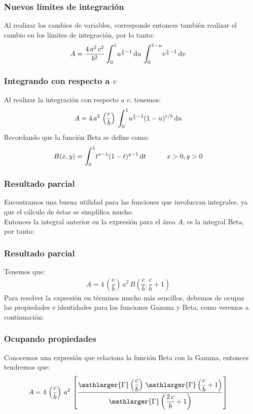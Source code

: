 \documentclass[12pt]{beamer}
\begin{document}
\begin{frame}
\frametitle{Nuevos límites de integración}
Al realizar los cambios de variables, corresponde entonces también realizar el cambio en los límites de integración, por lo tanto:
\pause 
\begin{align*}
A = \dfrac{4 \, a^{2} \, c^{2}}{b^{2}} \, \scaleint{6ex}_{\bs 0}^{1} u^{\frac{c}{b} - 1} \dd{u} \, \scaleint{6ex}_{\bs 0}^{1-u} v^{\frac{c}{b} - 1} \dd{v}
\end{align*}
\end{frame}
\begin{frame}
\frametitle{Integrando con respecto a $v$}
Al realizar la integración con respecto a $v$, tenemos:
\pause 
\begin{align*}
A = 4 \, a^{2} \, \left( \dfrac{c}{b} \right) \, \scaleint{6ex}_{\bs 0}^{1} u^{\frac{c}{b} - 1} (1 - u)^{c/b} \dd{u}
\end{align*}
\pause
Recordando que la función Beta se define como:
\pause 
\begin{align*}
B(x, y) = \scaleint{6ex}_{\bs 0}^{1} t^{x-1} (1 - t)^{y-1} \dd{t} \hspace{1cm} x > 0, y > 0
\end{align*}
\end{frame}
\begin{frame}
\frametitle{Resultado parcial}
Encontramos una buena utilidad para las funciones que involucran integrales, ya que el cálculo de éstas se simplifica mucho.
\\
\bigskip
\pause
Entonces la integral anterior en la expresión para el área $A$, es la integral Beta, por tanto:
\end{frame}
\begin{frame}
\frametitle{Resultado parcial}
Tenemos que:
\pause
\begin{align*}
A = 4 \, \left( \dfrac{c}{b} \right) \, a^{2} \, B \left( \dfrac{c}{b}, \dfrac{c}{b} + 1 \right)
\end{align*}
\pause
Para resolver la expresión en términos mucho más sencillos, debemos de ocupar las propiedades e identidades para las funciones Gamma y Beta, como veremos a continuación:
\end{frame}
\begin{frame}
\frametitle{Ocupando propiedades}
Conocemos una expresión que relaciona la función Beta con la Gamma, entonces tendremos que:
\pause 
\begin{align*}
A = 4 \, \left( \dfrac{c}{b} \right) \, a^{2} \, \left[ \dfrac{\mathlarger{\Gamma} \left( \dfrac{c}{b} \right) \, \mathlarger{\Gamma} \left( \dfrac{c}{b} + 1 \right)}{\mathlarger{\Gamma} \left( \dfrac{2 \, c}{b} + 1 \right)} \right]
\end{align*}
\end{frame}
\end{document}
